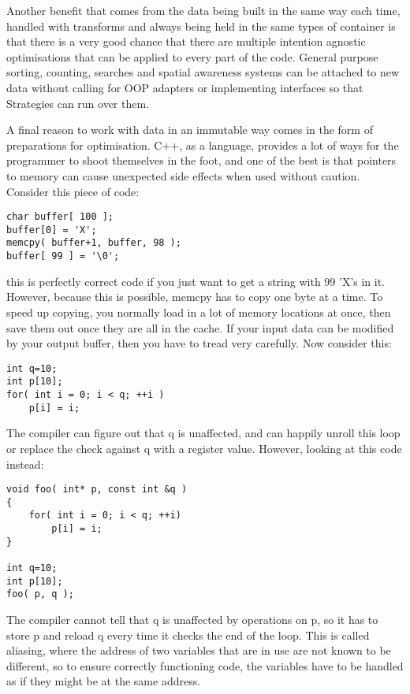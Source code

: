 Another benefit that comes from the data being built in the same way each time,
handled with transforms and always being held in the same types of container is
that there is a very good chance that there are multiple intention agnostic
optimisations that can be applied to every part of the code. General purpose
sorting, counting, searches and spatial awareness systems can be attached to
new data without calling for OOP adapters or implementing interfaces so that
Strategies can run over them.

A final reason to work with data in an immutable way comes in the form of
preparations for optimisation. C++, as a language, provides a lot of ways for
the programmer to shoot themselves in the foot, and one of the best is that
pointers to memory can cause unexpected side effects when used without caution.
Consider this piece of code:

\begin{lstlisting}[caption=byte copying]
char buffer[ 100 ];
buffer[0] = 'X';
memcpy( buffer+1, buffer, 98 );
buffer[ 99 ] = '\0';
\end{lstlisting}
 
this is perfectly correct code if you just want to get a string with 99 'X's in
it. However, because this is possible, memcpy has to copy one byte at a time.
To speed up copying, you normally load in a lot of memory locations at once,
then save them out once they are all in the cache. If your input data can be
modified by your output buffer, then you have to tread very carefully. Now
consider this:

\begin{lstlisting}[caption=trivially parallelisable code]
int q=10;
int p[10];
for( int i = 0; i < q; ++i )
	p[i] = i;
\end{lstlisting}

The compiler can figure out that q is unaffected, and can happily unroll this
loop or replace the check against q with a register value. However, looking at
this code instead:

\begin{lstlisting}[caption=potentially aliased int]
void foo( int* p, const int &q )
{
	for( int i = 0; i < q; ++i)
		p[i] = i;
}

int q=10;
int p[10];
foo( p, q );
\end{lstlisting}

The compiler cannot tell that q is unaffected by operations on p, so it has to
store p and reload q every time it checks the end of the loop. This is called
aliasing, where the address of two variables that are in use are not known to
be different, so to ensure correctly functioning code, the variables have to be
handled as if they might be at the same address.

